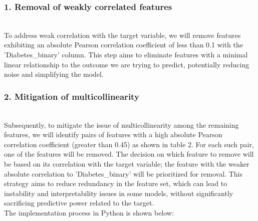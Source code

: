\subsubsection*{1. Removal of weakly correlated features}\\
To address weak correlation with the target variable, we will remove features exhibiting an absolute Pearson correlation coefficient of less than 0.1 with the 'Diabetes\_binary' column. This step aims to eliminate features with a minimal linear relationship to the outcome we are trying to predict, potentially reducing noise and simplifying the model.


\subsubsection*{2. Mitigation of multicollinearity}\\
Subsequently, to mitigate the issue of multicollinearity among the remaining features, we will identify pairs of features with a high absolute Pearson correlation coefficient (greater than 0.45) as shown in table 2. For each such pair, one of the features will be removed. The decision on which feature to remove will be based on its correlation with the target variable; the feature with the weaker absolute correlation to 'Diabetes\_binary' will be prioritized for removal. This strategy aims to reduce redundancy in the feature set, which can lead to instability and interpretability issues in some models, without significantly sacrificing predictive power related to the target.
\\
\newline
The implementation process in Python is shown below:
\\

\\



